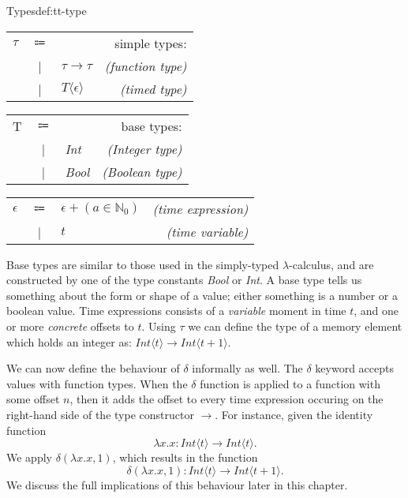 \begin{definitiontitled}{Types}{def:tt-type}
\begin{minipage}[b]{0.50\linewidth}
\begin{tabular}{lclr}
$\tau$  & $\Coloneqq$ &                                         & simple types:               \\
        & |           & $\tau \rightarrow \tau$                 & \textit{(function type)}    \\
        & |           & $T \langle \epsilon \rangle$            & \textit{(timed type)}       \\
\end{tabular}
\end{minipage}
\begin{minipage}[b]{0.40\linewidth}
\begin{tabular}{lclr}
T       & $\Coloneqq$ &                                         & base types:                 \\
        & |           & \textit{Int}                            & \textit{(Integer type)}     \\
        & |           & \textit{Bool}                           & \textit{(Boolean type)}     \\
\end{tabular}
\end{minipage}
\begin{tabular}{lclr}
$\epsilon$ & $\Coloneqq$ & $ \epsilon + (a \in \mathbb{N}_0)$   & \textit{(time expression)}  \\
           & |           & $ t $                                & \textit{(time variable)}    \\
\end{tabular}
\end{definitiontitled}

Base types are similar to those used in the simply-typed $\lambda$-calculus, and are constructed by one of the type constants \textit{Bool} or \textit{Int}.
A base type tells us something about the form or shape of a value; either something is a number or a boolean value.
Time expressions consists of a \textit{variable} moment in time $t$, and one or more \textit{concrete} offsets to $t$.
Using $\tau$ we can define the type of a memory element which holds an integer as: $\textit{Int}\langle t \rangle \to \textit{Int}\langle t + 1 \rangle$.

We can now define the behaviour of $\delta$ informally as well.
The $\delta$ keyword accepts values with function types.
When the $\delta$ function is applied to a function with some offset $n$, then it adds the offset to every time expression occuring on the right-hand side of the type constructor $\to$.
For instance, given the identity function \[\lambda x.x : \textit{Int} \langle t \rangle \to \textit{Int} \langle t \rangle.\]
We apply $\delta(\lambda x.x,1)$, which results in the function \[\delta(\lambda x.x,1) : \textit{Int} \langle t \rangle \to \textit{Int} \langle t + 1 \rangle.\]
We discuss the full implications of this behaviour later in this chapter.

